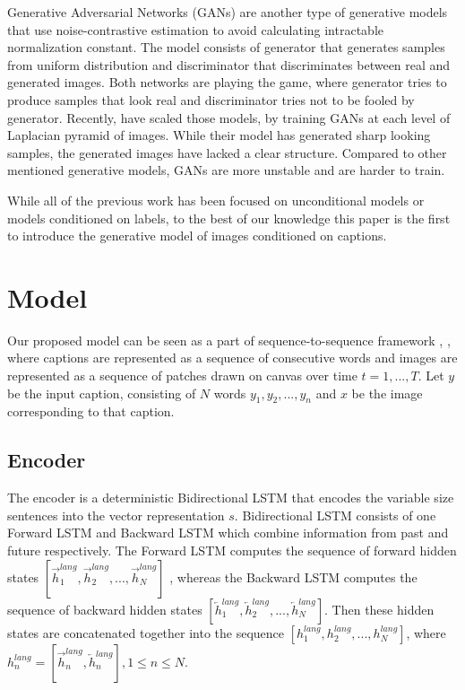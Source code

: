 \documentclass{article} %
\newcommand{\hlang}{h^{lang}}
\begin{document}
Generative Adversarial Networks (GANs) \citep{goodfellow_gan} are another type of generative models that use noise-contrastive estimation \citep{gutmann_nce} to avoid calculating intractable normalization constant. The model consists of generator that generates samples from uniform distribution and discriminator that discriminates between real and generated images. Both networks are playing the game, where generator tries to produce samples that look real and discriminator tries not to be fooled by generator. Recently, \cite{denton_lapgan} have scaled those models, by training GANs at each level of Laplacian pyramid of images. While their model has generated sharp looking samples, the generated images have lacked a clear structure. Compared to other mentioned generative models, GANs are more unstable and are harder to train.

While all of the previous work has been focused on unconditional models or models conditioned on labels, to the best of our knowledge this paper is the first to introduce the generative model of images conditioned on captions.

\section{Model}

Our proposed model can be seen as a part of sequence-to-sequence framework \citep{ilya_mt}, \citep{cho_mt}, \citep{nitish_video} where captions are represented as a sequence of consecutive words and images are represented as a sequence of patches drawn on canvas over time $t=1,...,T$. Let $y$ be the input caption, consisting of $N$ words $y_{1}, y_{2}, ..., y_{n}$ and $x$ be the image corresponding to that caption.

\subsection{Encoder}

The encoder is a deterministic Bidirectional LSTM that encodes the variable size sentences into the vector representation $s$. Bidirectional LSTM consists of one Forward LSTM and Backward LSTM which combine information from past and future respectively. The Forward LSTM computes the sequence of forward hidden states $[\overrightarrow{h}^{lang}_{1}, \overrightarrow{h}^{lang}_{2}, ..., \overrightarrow{h}^{lang}_{N}]$ , whereas the Backward LSTM computes the sequence of backward hidden states $[\overleftarrow{h}^{lang}_{1}, \overleftarrow{h}^{lang}_{2}, ..., \overleftarrow{h}^{lang}_{N}]$. Then these hidden states are concatenated together into the sequence $[\hlang_{1}, \hlang_{2}, ..., \hlang_{N}]$, where $\hlang_{n} = [\overrightarrow{h}^{lang}_{n}, \overleftarrow{h}^{lang}_{n}], 1\leq n\leq N$.
\end{document}
